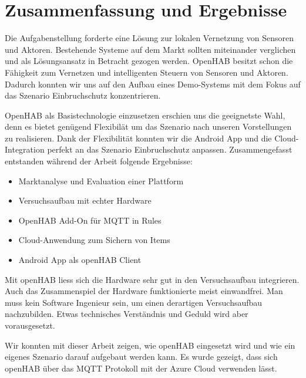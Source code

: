 \section{Zusammenfassung und Ergebnisse}

Die Aufgabenstellung forderte eine Lösung zur lokalen Vernetzung von Sensoren und Aktoren. Bestehende Systeme auf dem Markt sollten miteinander verglichen und als Lösungsansatz in Betracht gezogen werden. OpenHAB besitzt schon die Fähigkeit zum Vernetzen und intelligenten Steuern von Sensoren und Aktoren. Dadurch konnten wir uns auf den Aufbau eines Demo-Systems mit dem Fokus auf das Szenario Einbruchschutz konzentrieren.

OpenHAB als Basistechnologie einzusetzen erschien uns die geeignetste Wahl, denn es bietet genügend Flexibilät um das Szenario nach unseren Vorstellungen zu realisieren. Dank der Flexibilität konnten wir die Android App und die Cloud-Integration perfekt an das Szenario Einbruchschutz anpassen. Zusammengefasst entstanden während der Arbeit folgende Ergebnisse:
\begin{itemize}
	\item Marktanalyse und Evaluation einer Plattform
	\item Versuchsaufbau mit echter Hardware
	\item OpenHAB Add-On für MQTT in Rules
	\item Cloud-Anwendung zum Sichern von Items
	\item Android App als  openHAB Client
\end{itemize}

Mit openHAB liess sich die Hardware sehr gut in den Versuchsaufbau integrieren. Auch das Zusammenspiel der Hardware funktionierte meist einwandfrei. Man muss kein Software Ingenieur sein, um einen derartigen Versuchsaufbau nachzubilden. Etwas technisches Verständnis und Geduld wird aber vorausgesetzt.

Wir konnten mit dieser Arbeit zeigen, wie openHAB eingesetzt wird und wie ein eigenes Szenario darauf aufgebaut werden kann. Es wurde gezeigt, dass sich openHAB über das MQTT Protokoll mit der Azure Cloud verwenden lässt. 

